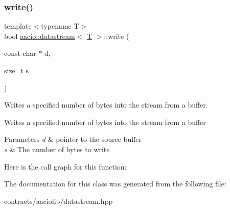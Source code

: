 \subsubsection{\texorpdfstring{write()}{write()}}
{\footnotesize\ttfamily template$<$typename T$>$ \\
bool \mbox{\hyperlink{classaacio_1_1datastream}{aacio\+::datastream}}$<$ \mbox{\hyperlink{struct_t}{T}} $>$\+::write (\begin{DoxyParamCaption}\item[{const char $\ast$}]{d,  }\item[{size\+\_\+t}]{s }\end{DoxyParamCaption})\hspace{0.3cm}{\ttfamily [inline]}}



Writes a specified number of bytes into the stream from a buffer. 

Writes a specified number of bytes into the stream from a buffer 
\begin{DoxyParams}{Parameters}
{\em d} & pointer to the source buffer \\
\hline
{\em s} & The number of bytes to write \\
\hline
\end{DoxyParams}
Here is the call graph for this function\+:


The documentation for this class was generated from the following file\+:\begin{DoxyCompactItemize}
\item 
contracts/aaciolib/datastream.\+hpp\end{DoxyCompactItemize}

